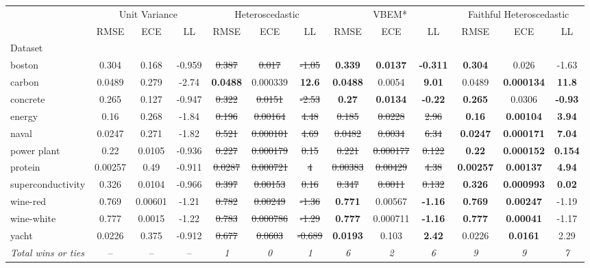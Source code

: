 \begin{tabular}{l|ccc|ccc|ccc|ccc}
\toprule
 & \multicolumn{3}{|c}{Unit Variance} & \multicolumn{3}{|c}{Heteroscedastic} & \multicolumn{3}{|c}{VBEM*} & \multicolumn{3}{|c}{Faithful Heteroscedastic} \\
 & RMSE & ECE & LL & RMSE & ECE & LL & RMSE & ECE & LL & RMSE & ECE & LL \\
Dataset &  &  &  &  &  &  &  &  &  &  &  &  \\
\midrule
boston & 0.304 & 0.168 & -0.959 & \sout{0.387} & \sout{0.017} & \sout{-1.05} & \textbf{0.339} & \textbf{0.0137} & \textbf{-0.311} & \textbf{0.304} & 0.026 & -1.63 \\
carbon & 0.0489 & 0.279 & -2.74 & \textbf{0.0488} & 0.000339 & \textbf{12.6} & \textbf{0.0488} & 0.0054 & \textbf{9.01} & 0.0489 & \textbf{0.000134} & \textbf{11.8} \\
concrete & 0.265 & 0.127 & -0.947 & \sout{0.322} & \sout{0.0151} & \sout{-2.53} & \textbf{0.27} & \textbf{0.0134} & \textbf{-0.22} & \textbf{0.265} & 0.0306 & \textbf{-0.93} \\
energy & 0.16 & 0.268 & -1.84 & \sout{0.196} & \sout{0.00164} & \sout{4.48} & \sout{0.185} & \sout{0.0228} & \sout{2.96} & \textbf{0.16} & \textbf{0.00104} & \textbf{3.94} \\
naval & 0.0247 & 0.271 & -1.82 & \sout{0.521} & \sout{0.000101} & \sout{4.69} & \sout{0.0482} & \sout{0.0034} & \sout{6.34} & \textbf{0.0247} & \textbf{0.000171} & \textbf{7.04} \\
power plant & 0.22 & 0.0105 & -0.936 & \sout{0.227} & \sout{0.000179} & \sout{0.15} & \sout{0.221} & \sout{0.000177} & \sout{0.122} & \textbf{0.22} & \textbf{0.000152} & \textbf{0.154} \\
protein & 0.00257 & 0.49 & -0.911 & \sout{0.0287} & \sout{0.000721} & \sout{4} & \sout{0.00383} & \sout{0.00429} & \sout{4.38} & \textbf{0.00257} & \textbf{0.00137} & \textbf{4.94} \\
superconductivity & 0.326 & 0.0104 & -0.966 & \sout{0.397} & \sout{0.00153} & \sout{0.16} & \sout{0.347} & \sout{0.0011} & \sout{0.132} & \textbf{0.326} & \textbf{0.000993} & \textbf{0.02} \\
wine-red & 0.769 & 0.00601 & -1.21 & \sout{0.782} & \sout{0.00249} & \sout{-1.36} & \textbf{0.771} & 0.00567 & \textbf{-1.16} & \textbf{0.769} & \textbf{0.00247} & -1.19 \\
wine-white & 0.777 & 0.0015 & -1.22 & \sout{0.783} & \sout{0.000786} & \sout{-1.29} & \textbf{0.777} & 0.000711 & \textbf{-1.16} & \textbf{0.777} & \textbf{0.00041} & -1.17 \\
yacht & 0.0226 & 0.375 & -0.912 & \sout{0.677} & \sout{0.0603} & \sout{-0.689} & \textbf{0.0193} & 0.103 & \textbf{2.42} & 0.0226 & \textbf{0.0161} & 2.29 \\
\textit{{Total wins or ties}} & -- & -- & -- & \textit{1} & \textit{0} & \textit{1} & \textit{6} & \textit{2} & \textit{6} & \textit{9} & \textit{9} & \textit{7} \\
\bottomrule
\end{tabular}
